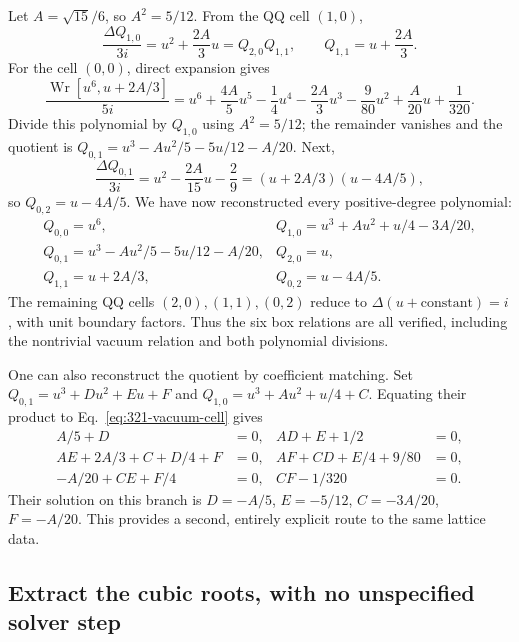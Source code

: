\documentclass[11pt]{article}
\newcommand{\Wron}{\operatorname{Wr}}
\begin{document}
Let $A=\sqrt{15}/6$, so $A^2=5/12$.
From the QQ cell $(1,0)$,
\[
 \frac{\Delta Q_{1,0}}{3i}
 =u^2+\frac{2A}{3}u=Q_{2,0}Q_{1,1},\qquad
 Q_{1,1}=u+\frac{2A}{3}.
\]
For the cell $(0,0)$, direct expansion gives
\begin{equation}
 \label{eq:321-vacuum-cell}
 \frac{\Wron[u^6,u+2A/3]}{5i}
 =u^6+\frac{4A}{5}u^5-\frac14u^4-\frac{2A}{3}u^3
      -\frac9{80}u^2+\frac{A}{20}u+\frac1{320}.
\end{equation}
Divide this polynomial by $Q_{1,0}$ using $A^2=5/12$; the remainder
vanishes and the quotient is
$Q_{0,1}=u^3-Au^2/5-5u/12-A/20$.
Next,
\[
 \frac{\Delta Q_{0,1}}{3i}
 =u^2-\frac{2A}{15}u-\frac29
 =(u+2A/3)(u-4A/5),
\]
so $Q_{0,2}=u-4A/5$.
We have now reconstructed every positive-degree polynomial:
\begin{equation}
 \label{eq:321-all-q}
 \begin{array}{ll}
 Q_{0,0}=u^6,& Q_{1,0}=u^3+Au^2+u/4-3A/20,\\
 Q_{0,1}=u^3-Au^2/5-5u/12-A/20,& Q_{2,0}=u,\\
 Q_{1,1}=u+2A/3,&Q_{0,2}=u-4A/5.
 \end{array}
\end{equation}
The remaining QQ cells $(2,0),(1,1),(0,2)$ reduce to
$\Delta(u+\text{constant})=i$, with unit boundary factors.
Thus the six box relations are all verified, including the nontrivial
vacuum relation and both polynomial divisions.

One can also reconstruct the quotient by coefficient matching. Set
$Q_{0,1}=u^3+D u^2+E u+F$ and
$Q_{1,0}=u^3+A u^2+u/4+C$. Equating their product to
Eq.~\eqref{eq:321-vacuum-cell} gives
\begin{align*}
 A/5+D&=0,& AD+E+1/2&=0,\\
 AE+2A/3+C+D/4+F&=0,& AF+CD+E/4+9/80&=0,\\
 -A/20+CE+F/4&=0,&CF-1/320&=0.
\end{align*}
Their solution on this branch is
$D=-A/5$, $E=-5/12$, $C=-3A/20$, $F=-A/20$.
This provides a second, entirely explicit route to the same lattice data.

\subsection{Extract the cubic roots, with no unspecified solver step}
\end{document}
